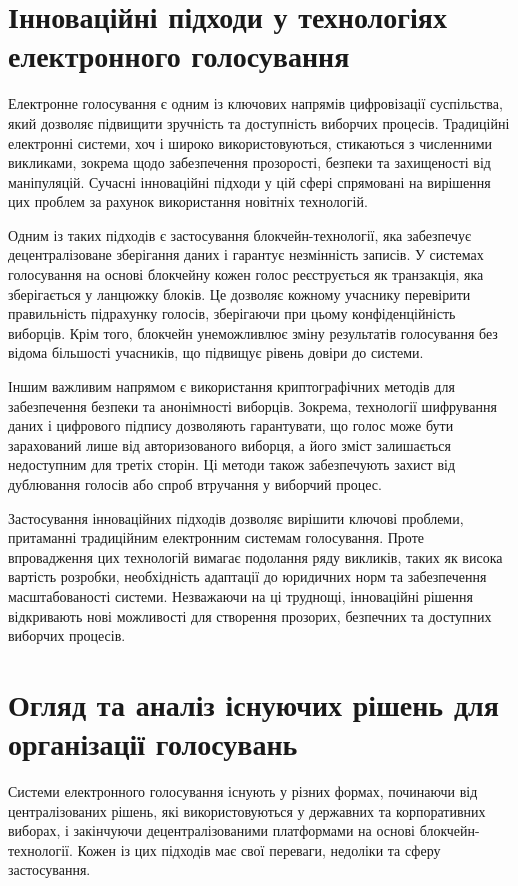 \documentclass[14pt]{extreport}
\begin{document}
  \section{Інноваційні підходи у технологіях електронного голосування}
  
    Електронне голосування є одним із ключових напрямів цифровізації суспільства, який дозволяє підвищити зручність та доступність виборчих процесів. Традиційні електронні системи, хоч і широко використовуються, стикаються з численними викликами, зокрема щодо забезпечення прозорості, безпеки та захищеності від маніпуляцій. Сучасні інноваційні підходи у цій сфері спрямовані на вирішення цих проблем за рахунок використання новітніх технологій.

  Одним із таких підходів є застосування блокчейн-технології, яка забезпечує децентралізоване зберігання даних і гарантує незмінність записів. У системах голосування на основі блокчейну кожен голос реєструється як транзакція, яка зберігається у ланцюжку блоків. Це дозволяє кожному учаснику перевірити правильність підрахунку голосів, зберігаючи при цьому конфіденційність виборців. Крім того, блокчейн унеможливлює зміну результатів голосування без відома більшості учасників, що підвищує рівень довіри до системи.

  Іншим важливим напрямом є використання криптографічних методів для забезпечення безпеки та анонімності виборців. Зокрема, технології шифрування даних і цифрового підпису дозволяють гарантувати, що голос може бути зарахований лише від авторизованого виборця, а його зміст залишається недоступним для третіх сторін. Ці методи також забезпечують захист від дублювання голосів або спроб втручання у виборчий процес.

  Застосування інноваційних підходів дозволяє вирішити ключові проблеми, притаманні традиційним електронним системам голосування. Проте впровадження цих технологій вимагає подолання ряду викликів, таких як висока вартість розробки, необхідність адаптації до юридичних норм та забезпечення масштабованості системи. Незважаючи на ці труднощі, інноваційні рішення відкривають нові можливості для створення прозорих, безпечних та доступних виборчих процесів.
  
  \section{Огляд та аналіз існуючих рішень для організації голосувань}
  
  Системи електронного голосування існують у різних формах, починаючи від централізованих рішень, які використовуються у державних та корпоративних виборах, і закінчуючи децентралізованими платформами на основі блокчейн-технології. Кожен із цих підходів має свої переваги, недоліки та сферу застосування.
\end{document}
